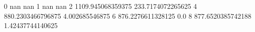 0 nan nan
1 nan nan
2 1109.945068359375 233.7174072265625
4 880.2303466796875 4.002685546875
6 876.2276611328125 0.0
8 877.6520385742188 1.42437744140625
